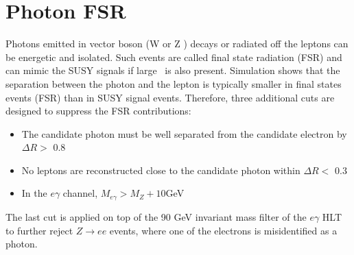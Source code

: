 \documentclass[thesis.tex]{subfiles}
\renewcommand\_{\textunderscore\allowbreak}
\begin{document}
\section{Photon FSR}
  Photons emitted in vector boson (W or Z ) decays or radiated off the leptons can be energetic and isolated. Such events are called final state radiation (FSR) and can mimic the SUSY signals if large \MET~is also present. Simulation shows that the separation between the photon and the lepton is typically smaller in final states events (FSR) than in SUSY signal events. Therefore, three additional cuts are designed to suppress the FSR contributions:
\begin{itemize}
\item The candidate photon must be well separated from the candidate electron by $\Delta R >$ 0.8
\item No leptons are reconstructed close to the candidate photon within $\Delta R <$ 0.3
\item In the $e\gamma$ channel, $M_{e\gamma} > M_Z + 10 $GeV 
\end{itemize}

The last cut is applied on top of the 90 GeV invariant mass filter of the $e\gamma$ HLT to further reject $Z\rightarrow ee$ events, where one of the electrons is misidentified as a photon.
\end{document}

